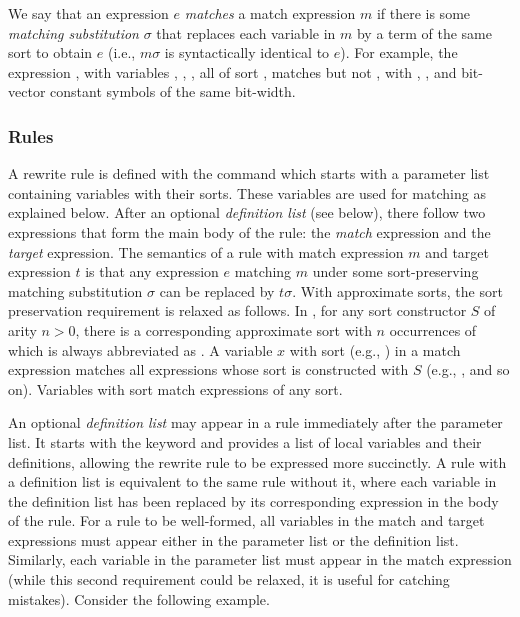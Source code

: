 We say that an expression $e$ \emph{matches}
a match expression $m$ if there is some \emph{matching substitution} $\sigma$
that replaces each variable in $m$ by a term of the same sort to obtain $e$ 
(i.e., $m\sigma$ is syntactically identical to $e$).
For example, the expression ,
with variables , , ,
all of sort ,
matches 
but not ,
with , , and  bit-vector constant
symbols of the same bit-width.

\subsubsection{\dsl Rules}
A \dsl rewrite rule is defined with the  command
which starts with a parameter list containing variables with their sorts.  
These variables are used for matching as explained below.  
After an optional \emph{definition list} (see below), 
there follow two expressions that form the main body of the rule:
the \emph{match} expression and the \emph{target} expression.
The semantics of a rule with match expression $m$ and target expression $t$
is that any expression $e$ matching $m$ under some sort-preserving matching substitution $\sigma$
can be replaced by $t\sigma$.
%
With approximate sorts, the sort preservation requirement is relaxed as follows.
In \dsl, for any sort constructor $S$ of arity $n > 0$, 
there is a corresponding approximate sort 
with $n$ occurrences of 
which is always abbreviated as .
A variable $x$ with sort  (e.g., ) 
in a match expression matches all expressions whose sort is constructed with $S$
(e.g., ,  and so on).
Variables with sort  match expressions of any sort.

An optional \textit{definition list} may appear in a \dsl rule immediately 
after the parameter list. 
It starts with the keyword  and provides 
a list of local variables and their definitions,
allowing the rewrite rule to be expressed more succinctly.
A rule with a definition list is equivalent to the same
rule without it, where each variable in the definition list
has been replaced by its corresponding expression in the body of the rule.
For a rule to be well-formed, all variables in the match and target
expressions must appear either in the parameter list or the definition list.
Similarly, each variable in the parameter list must appear in the match
expression (while this second requirement could be relaxed, it is useful for
catching mistakes).
%
Consider the following example.

